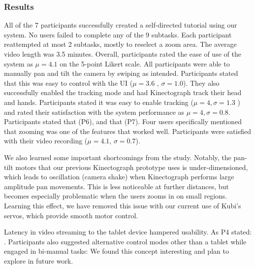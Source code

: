 \subsubsection{Results}
All of the 7 participants successfully created a self-directed tutorial using our system. No users failed to complete any of the 9 subtasks. Each participant reattempted at most 2 subtasks, mostly to reselect a zoom area. The average video length was 3.5 minutes. Overall, participants rated the ease of use of the system as $\mu=4.1$ on the 5-point Likert scale.
%
All participants were able to manually pan and tilt the camera by swiping as intended. Participants stated that this was easy to control with the UI ($\mu=3.6$ , $\sigma = 1.0$). They also successfully enabled the tracking mode and had Kinectograph track their head and hands. Participants stated it was easy to enable tracking ($\mu=4, \sigma=1.3$ ) and rated their satisfaction with the system performance as $\mu=4, \sigma=0.8$.  Participants stated that  (P6), and that  (P7). Four users specifically mentioned that zooming was one of the features that worked well. Participants were satisfied with their video recording ($\mu=4.1$, $\sigma=0.7$).


We also learned some important shortcomings from the study. Notably, the pan-tilt motors that our previous Kinectograph prototype uses is under-dimensioned, which leads to oscillation (camera shake) when Kinectograph performs large amplitude pan movements. This is less noticeable at further distances, but becomes especially problematic when the users zooms in on small regions. Learning this effect, we have removed this issue with our current use of Kubi's servos, which provide smooth motor control.

Latency in video streaming to the tablet device hampered usability. As P4 stated: .
%
%
Participants also suggested alternative control modes other than a tablet while engaged in bi-manual tasks:  We found this concept interesting and plan to explore in future work.

